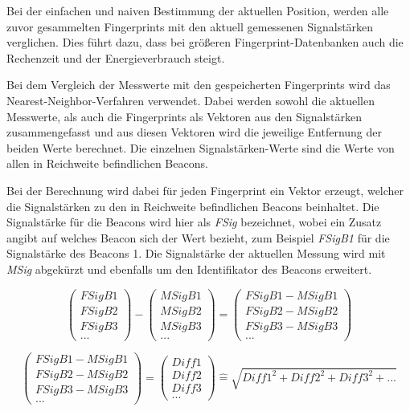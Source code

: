 Bei der einfachen und naiven Bestimmung der aktuellen Position, werden alle zuvor gesammelten Fingerprints mit den aktuell gemessenen Signalstärken verglichen. Dies führt dazu, dass bei größeren Fingerprint-Datenbanken auch die Rechenzeit und der Energieverbrauch steigt. 

Bei dem Vergleich der Messwerte mit den gespeicherten Fingerprints wird das Nearest-Neighbor-Verfahren verwendet. Dabei werden sowohl die aktuellen Messwerte, als auch die Fingerprints als Vektoren aus den Signalstärken zusammengefasst und aus diesen Vektoren wird die jeweilige Entfernung der beiden Werte berechnet. Die einzelnen Signalstärken-Werte sind die Werte von allen in Reichweite befindlichen Beacons.

Bei der Berechnung wird dabei für jeden Fingerprint ein Vektor erzeugt, welcher die Signalstärken zu den in Reichweite befindlichen Beacons beinhaltet.
Die Signalstärke für die Beacons wird hier als \emph{FSig} bezeichnet, wobei ein Zusatz angibt auf welches Beacon sich der Wert bezieht, zum Beispiel \emph{FSigB1} für die Signalstärke des Beacons 1.
Die Signalstärke der aktuellen Messung wird mit \emph{MSig} abgekürzt und ebenfalls um den Identifikator des Beacons erweitert.


\begin{equation}
	\begin{pmatrix}
		FSigB1 \\
		FSigB2 \\
		FSigB3 \\
		...
	\end{pmatrix} -
	\begin{pmatrix}
		MSigB1 \\
		MSigB2 \\
		MSigB3 \\
		...
	\end{pmatrix}
	= 
	\begin{pmatrix}
		FSigB1 - MSigB1 \\
		FSigB2 - MSigB2 \\
		FSigB3 - MSigB3 \\
		...
	\end{pmatrix}
\end{equation}

\begin{equation}
	\begin{pmatrix}
		FSigB1 - MSigB1 \\
		FSigB2 - MSigB2 \\
		FSigB3 - MSigB3 \\
		...
	\end{pmatrix}
	=
	\begin{pmatrix}
		Diff1 \\
		Diff2 \\
		Diff3 \\
		...
	\end{pmatrix}
	\widehat{=}
	\sqrt{Diff1^2 + Diff2^2 + Diff3^2 + ...}
\end{equation}

